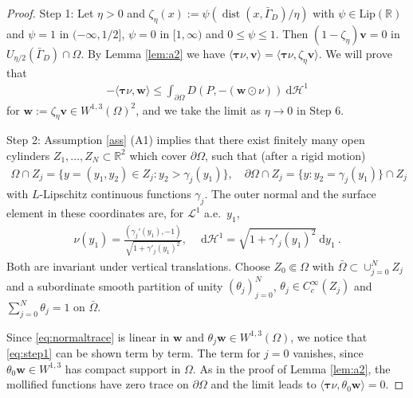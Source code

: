 \documentclass[10pt,a4paper]{amsart}
\newcommand{\bftau}{\boldsymbol{\tau}}
\newcommand{\bfv}{\boldsymbol{v}}
\newcommand{\bfw}{\boldsymbol{w}}
\newcommand{\dd}{\:\mathrm{d}}
\DeclareMathOperator{\dist}{dist}
\begin{document}
\begin{proof}
    Step 1:
    Let $\eta>0$ and $\zeta_\eta(x) := \psi (\dist(x,\bar\Gamma_D)/\eta)$ with $\psi \in \mathrm{Lip}(\mathbb R)$
    and $\psi = 1$ in $(-\infty,1/2]$, $\psi=0$ in $[1,\infty)$ and $0\leq \psi \leq 1$.
    Then $(1-\zeta_\eta)\bfv =0$ in $U_{\eta/2}(\bar\Gamma_D)\cap \Omega$. By Lemma \ref{lem:a2} we have
    $\langle \bftau \nu, \bfv\rangle = \langle \bftau\nu,\zeta_\eta \bfv\rangle$. We will prove that
    \begin{align}
        -\langle\bftau\nu,\bfw\rangle \leq \int_{\partial\Omega} D(P,-(\bfw\odot \nu)) \dd \mathcal{H}^1 \label{eq:step1}
    \end{align}
    for $\bfw:=\zeta_\eta\bfv \in W^{1,3}(\Omega)^2$, and we take the limit as $\eta\rightarrow0$
    in Step 6.

    Step 2:
    Assumption \ref{ass} (A1) implies that there exist finitely many open cylinders $Z_1,\dots,Z_N \subset \mathbb R^2$
    which cover $\partial\Omega$, such that (after a rigid motion)
    \begin{align*}
        \Omega\cap Z_j = \{y=(y_1,y_2)\in Z_j : y_2>\gamma_j(y_1)\}, \quad \partial\Omega\cap Z_j
        =\{y:y_2=\gamma_j(y_1)\}\cap Z_j
    \end{align*}
    with $L$-Lipschitz continuous functions $\gamma_j$. The outer normal and the surface element
    in these coordinates are, for $\mathcal{L}^1$ a.e.\ $y_1$,
    \begin{align*}
        \nu(y_1) = \frac{(\gamma_j'(y_1),-1)}{\sqrt{1+\gamma'_j(y_1)^2}}, \quad \dd \mathcal{H}^1 = \sqrt{1+\gamma'_j(y_1)^2} \dd y_1 \ .
    \end{align*}
    Both are invariant under vertical translations. Choose $Z_0\Subset \Omega$ with
    $\bar\Omega \subset \cup_{j=0}^N Z_j$ and a subordinate smooth partition of unity $(\theta_j)_{j=0}^N$,
    $\theta_j\in C^\infty_c(Z_j)$ and $\sum_{j=0}^{N}\theta_j =1$ on $\bar\Omega$.

    Since \eqref{eq:normaltrace} is linear in $\bfw$ and
    $\theta_j\bfw \in W^{1,3}(\Omega)$, we notice that \eqref{eq:step1} can be shown term by term.
    The term for $j=0$ vanishes, since $\theta_0\bfw\in W^{1,3}$ has compact support
    in $\Omega$. As in the proof of Lemma \ref{lem:a2}, the mollified functions have zero trace on $\partial\Omega$ and the limit leads to
    $\langle \bftau\nu, \theta_0\bfw\rangle =0$.


\end{proof}
\end{document}
